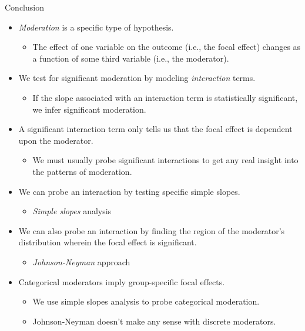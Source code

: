 \documentclass{beamer}\usepackage[]{graphicx}\usepackage[]{color}
\begin{document}
\watermarkon %

\begin{frame}[allowframebreaks]{Conclusion}
  
  \begin{itemize}
  \item \emph{Moderation} is a specific type of hypothesis.
    \vc
    \begin{itemize}
    \item The effect of one variable on the outcome (i.e., the focal effect) 
      changes as a function of some third variable (i.e., the moderator).
    \end{itemize}
    \vb
  \item We test for significant moderation by modeling \emph{interaction} terms.
    \vc
    \begin{itemize}
    \item If the slope associated with an interaction term is statistically 
      significant, we infer significant moderation.
    \end{itemize}
    \vb
  \item A significant interaction term only tells us that the focal effect is 
    dependent upon the moderator.
    \vc
    \begin{itemize}
    \item We must usually probe significant interactions to get any real insight 
      into the patterns of moderation.
    \end{itemize}
    
    \pagebreak
    
  \item We can probe an interaction by testing specific simple slopes.
    \vc
    \begin{itemize}
    \item \emph{Simple slopes} analysis
    \end{itemize}
    \vb
  \item We can also probe an interaction by finding the region of the 
    moderator's distribution wherein the focal effect is significant.
    \vc
    \begin{itemize}
    \item \emph{Johnson-Neyman} approach
    \end{itemize}
    \vb
  \item Categorical moderators imply group-specific focal effects.
    \vc
    \begin{itemize}
    \item We use simple slopes analysis to probe categorical moderation.
      \vc
    \item Johnson-Neyman doesn't make any sense with discrete moderators.
    \end{itemize}
  

\end{itemize}
\end{frame}
\end{document}
